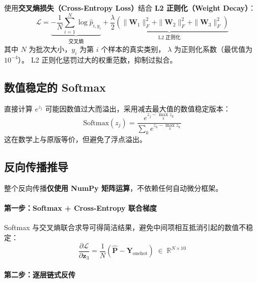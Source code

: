 \documentclass[12pt, a4paper]{article}
\begin{document}
使用\textbf{交叉熵损失（Cross-Entropy Loss）}结合 \textbf{L2 正则化（Weight Decay）}：
\begin{equation}
  \mathcal{L} = \underbrace{-\frac{1}{N}\sum_{i=1}^{N}\log \hat{p}_{i,y_i}}_{\text{交叉熵}}
              + \underbrace{\frac{\lambda}{2}\left(\|\mathbf{W}_1\|_F^2 + \|\mathbf{W}_2\|_F^2 + \|\mathbf{W}_3\|_F^2\right)}_{\text{L2 正则化}}
  \label{eq:loss}
\end{equation}
其中 $N$ 为批次大小，$y_i$ 为第 $i$ 个样本的真实类别，
$\lambda$ 为正则化系数（最优值为 $10^{-4}$）。
L2 正则化惩罚过大的权重范数，抑制过拟合。

\subsection{数值稳定的 Softmax}

直接计算 $e^{z_j}$ 可能因数值过大而溢出，采用减去最大值的数值稳定版本：
\begin{equation}
  \mathrm{Softmax}(z_j) = \frac{e^{z_j - \max_k z_k}}{\sum_k e^{z_k - \max_k z_k}}
\end{equation}
这在数学上与原版等价，但避免了浮点溢出。

\subsection{反向传播推导}

整个反向传播\textbf{仅使用 NumPy 矩阵运算}，不依赖任何自动微分框架。

\paragraph{第一步：Softmax + Cross-Entropy 联合梯度}

Softmax 与交叉熵联合求导可得简洁结果，避免中间项相互抵消引起的数值不稳定：
\begin{equation}
  \frac{\partial \mathcal{L}}{\partial \mathbf{z}_3} = \frac{1}{N}\left(\hat{\mathbf{P}} - \mathbf{Y}_{\mathrm{onehot}}\right) \;\in\; \mathbb{R}^{N\times10}
  \label{eq:dz3}
\end{equation}

\paragraph{第二步：逐层链式反传}
\end{document}
